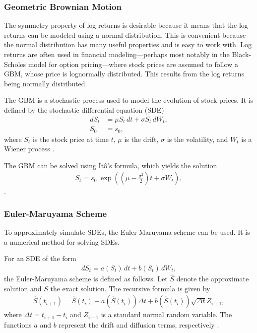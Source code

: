 \subsubsection{Geometric Brownian Motion}
The symmetry property of log returns is desirable because it means that the log returns can be modeled using a normal distribution. This is convenient because the normal distribution has many useful properties and is easy to work with. Log returns are often used in financial modeling—perhaps most notably in the Black-Scholes model for option pricing—where stock prices are assumed to follow a \gls{GBM}, whose price is lognormally distributed. This results from the log returns being normally distributed.

The \gls{GBM} is a stochastic process used to model the evolution of stock prices. It is defined by the stochastic differential equation (SDE)
\begin{align*}
    dS_t &= \mu S_t \,dt + \sigma S_t \,dW_t, \\
    S_0 &= s_0,
\end{align*}
where $S_t$ is the stock price at time $t$, $\mu$ is the drift, $\sigma$ is the volatility, and $W_t$ is a Wiener process \citep[p.~67]{Bjork2019Edition4}.

The \gls{GBM} can be solved using Itô's formula, which yields the solution
\begin{align*}
    S_t = s_0 \; \exp\left( \left( \mu - \frac{\sigma^2}{2} \right)t + \sigma W_t \right),
\end{align*}
\citep[p.~70]{Bjork2019Edition4}.

\subsubsection{Euler-Maruyama Scheme}\label{sec:EulerMaruyama}
To approximately simulate \gls{SDE}s, the Euler-Maruyama scheme can be used. It is a numerical method for solving \gls{SDE}s.

For an \gls{SDE} of the form
\begin{align*}
    dS_t = a(S_t)\,dt + b(S_t)\,dW_t,
\end{align*}
the Euler-Maruyama scheme is defined as follows. Let $\hat{S}$ denote the approximate solution and $S$ the exact solution. The recursive formula is given by
\begin{align*}
    \hat{S}(t_{i+1}) = \hat{S}(t_i) + a(\hat{S}(t_i)) \Delta t + b(\hat{S}(t_i)) \sqrt{\Delta t} Z_{i+1},
\end{align*}
where $\Delta t = t_{i+1} - t_i$ and $Z_{i+1}$ is a standard normal random variable. The functions $a$ and $b$ represent the drift and diffusion terms, respectively \citep[pp.~339--340]{glasserman2004monte}.

